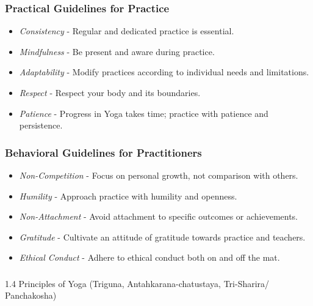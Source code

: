 \begin{frame}[fragile]\frametitle{Practical Guidelines for Practice}

      \begin{itemize}
		\item \textit{Consistency} - Regular and dedicated practice is essential.
		\item \textit{Mindfulness} - Be present and aware during practice.
		\item \textit{Adaptability} - Modify practices according to individual needs and limitations.
		\item \textit{Respect} - Respect your body and its boundaries.
		\item \textit{Patience} - Progress in Yoga takes time; practice with patience and persistence.
	  \end{itemize}

\end{frame}

\begin{frame}[fragile]\frametitle{Behavioral Guidelines for Practitioners}

      \begin{itemize}
		\item \textit{Non-Competition} - Focus on personal growth, not comparison with others.
		\item \textit{Humility} - Approach practice with humility and openness.
		\item \textit{Non-Attachment} - Avoid attachment to specific outcomes or achievements.
		\item \textit{Gratitude} - Cultivate an attitude of gratitude towards practice and teachers.
		\item \textit{Ethical Conduct} - Adhere to ethical conduct both on and off the mat.
	  \end{itemize}

\end{frame}




\begin{frame}[fragile]\frametitle{}
\begin{center}
{\Large 1.4 Principles of Yoga (Triguna, Antahkarana-chatustaya, Tri-Sharira/ Panchakosha)}
\end{center}
\end{frame}

